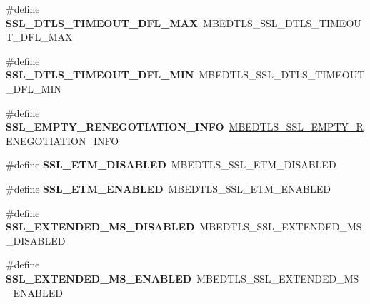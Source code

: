\begin{DoxyCompactItemize}
\item 
\mbox{\label{compat-1_83_8h_aaa96683577b635e4de52f06a83e109a9}} 
\#define {\bfseries S\+S\+L\+\_\+\+D\+T\+L\+S\+\_\+\+T\+I\+M\+E\+O\+U\+T\+\_\+\+D\+F\+L\+\_\+\+M\+AX}~M\+B\+E\+D\+T\+L\+S\+\_\+\+S\+S\+L\+\_\+\+D\+T\+L\+S\+\_\+\+T\+I\+M\+E\+O\+U\+T\+\_\+\+D\+F\+L\+\_\+\+M\+AX
\item 
\mbox{\label{compat-1_83_8h_a1ebfa53698b208dddc6e20c0b5e89149}} 
\#define {\bfseries S\+S\+L\+\_\+\+D\+T\+L\+S\+\_\+\+T\+I\+M\+E\+O\+U\+T\+\_\+\+D\+F\+L\+\_\+\+M\+IN}~M\+B\+E\+D\+T\+L\+S\+\_\+\+S\+S\+L\+\_\+\+D\+T\+L\+S\+\_\+\+T\+I\+M\+E\+O\+U\+T\+\_\+\+D\+F\+L\+\_\+\+M\+IN
\item 
\mbox{\label{compat-1_83_8h_a61a7c669453e92d91c13e84c205e6dc2}} 
\#define {\bfseries S\+S\+L\+\_\+\+E\+M\+P\+T\+Y\+\_\+\+R\+E\+N\+E\+G\+O\+T\+I\+A\+T\+I\+O\+N\+\_\+\+I\+N\+FO}~\mbox{\hyperlink{ssl_8h_adcfcbbd2bb1a0d4c2a9589f371fd6b83}{M\+B\+E\+D\+T\+L\+S\+\_\+\+S\+S\+L\+\_\+\+E\+M\+P\+T\+Y\+\_\+\+R\+E\+N\+E\+G\+O\+T\+I\+A\+T\+I\+O\+N\+\_\+\+I\+N\+FO}}
\item 
\mbox{\label{compat-1_83_8h_a4f82efda74a681eca666ada848301665}} 
\#define {\bfseries S\+S\+L\+\_\+\+E\+T\+M\+\_\+\+D\+I\+S\+A\+B\+L\+ED}~M\+B\+E\+D\+T\+L\+S\+\_\+\+S\+S\+L\+\_\+\+E\+T\+M\+\_\+\+D\+I\+S\+A\+B\+L\+ED
\item 
\mbox{\label{compat-1_83_8h_a49d0a70c0eedf151c79e169e3d462e13}} 
\#define {\bfseries S\+S\+L\+\_\+\+E\+T\+M\+\_\+\+E\+N\+A\+B\+L\+ED}~M\+B\+E\+D\+T\+L\+S\+\_\+\+S\+S\+L\+\_\+\+E\+T\+M\+\_\+\+E\+N\+A\+B\+L\+ED
\item 
\mbox{\label{compat-1_83_8h_af9f02572f8754d4827e1a71b960cafaf}} 
\#define {\bfseries S\+S\+L\+\_\+\+E\+X\+T\+E\+N\+D\+E\+D\+\_\+\+M\+S\+\_\+\+D\+I\+S\+A\+B\+L\+ED}~M\+B\+E\+D\+T\+L\+S\+\_\+\+S\+S\+L\+\_\+\+E\+X\+T\+E\+N\+D\+E\+D\+\_\+\+M\+S\+\_\+\+D\+I\+S\+A\+B\+L\+ED
\item 
\mbox{\label{compat-1_83_8h_a432cca2effb4678a474f0536f8ab51a2}} 
\#define {\bfseries S\+S\+L\+\_\+\+E\+X\+T\+E\+N\+D\+E\+D\+\_\+\+M\+S\+\_\+\+E\+N\+A\+B\+L\+ED}~M\+B\+E\+D\+T\+L\+S\+\_\+\+S\+S\+L\+\_\+\+E\+X\+T\+E\+N\+D\+E\+D\+\_\+\+M\+S\+\_\+\+E\+N\+A\+B\+L\+ED

\end{DoxyCompactItemize}

